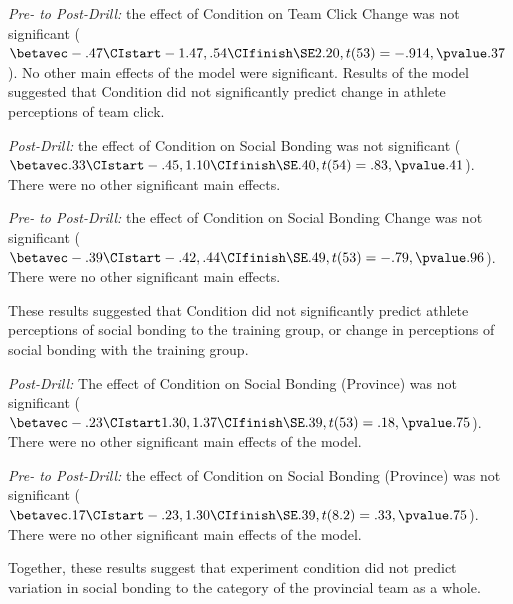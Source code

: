 \textit{Pre- to Post-Drill:} the effect of Condition on Team Click Change was not significant ($\betavec -.47 \CIstart -1.47, .54 \CIfinish \SE 2.20, t(53)= -.914, \pvalue .37$). No other main effects of the model were significant.  Results of the model suggested that Condition did not significantly predict change in athlete perceptions of team click.


\textit{Post-Drill:} the effect of Condition on Social Bonding was not significant
($\betavec .33 \CIstart -.45, 1.10 \CIfinish \SE .40, t(54)= .83, \pvalue .41$). There were no other significant main effects.

\textit{Pre- to Post-Drill:} the effect of Condition on Social Bonding Change was not significant ($\betavec -.39 \CIstart -.42, .44 \CIfinish \SE .49, t(53)= -.79, \pvalue .96$). There were no other significant main effects.

These results suggested that Condition did not significantly predict athlete perceptions of social bonding to the training group, or change in perceptions of social bonding with the training group.



\textit{Post-Drill:}
The effect of Condition on Social Bonding (Province) was not significant ($\betavec -.23 \CIstart 1.30, 1.37 \CIfinish \SE .39, t(53)= .18, \pvalue .75$). There were no other significant main effects of the model.

\textit{Pre- to Post-Drill:} the effect of Condition on Social Bonding (Province) was not significant ($\betavec .17 \CIstart -.23, 1.30 \CIfinish \SE .39, t(8.2)= .33, \pvalue .75$). There were no other significant main effects of the model.

Together, these results suggest that experiment condition did not predict variation in social bonding to the category of the provincial team as a whole.





